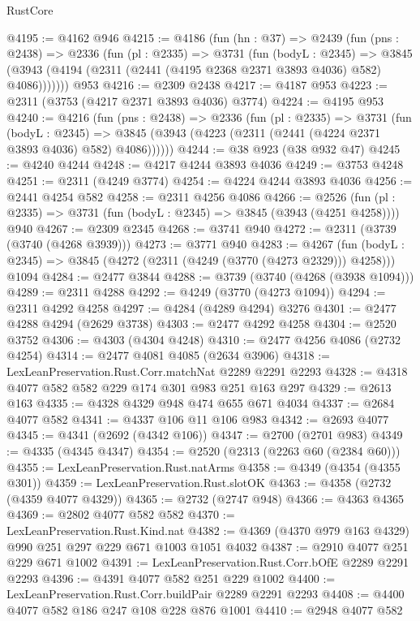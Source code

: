 \begin{lexlean}{RustCore}
\begin{coremodule}
@4195 := @4162 @946
@4215 := @4186
    (fun (hn : @37) =>
    @2439
      (fun (pns : @2438) =>
      @2336
        (fun (pl : @2335) =>
        @3731
          (fun (bodyL : @2345) =>
          @3845 (@3943 (@4194 (@2311 (@2441 (@4195 @2368 @2371 @3893 @4036) @582) @4086)))))))
    @953
@4216 := @2309 @2438
@4217 := @4187 @953
@4223 := @2311 (@3753 (@4217 @2371 @3893 @4036) @3774)
@4224 := @4195 @953
@4240 := @4216
    (fun (pns : @2438) =>
    @2336
      (fun (pl : @2335) =>
      @3731
        (fun (bodyL : @2345) =>
        @3845 (@3943 (@4223 (@2311 (@2441 (@4224 @2371 @3893 @4036) @582) @4086))))))
@4244 := @38 @923 (@38 @932 @47)
@4245 := @4240 @4244
@4248 := @4217 @4244 @3893 @4036
@4249 := @3753 @4248
@4251 := @2311 (@4249 @3774)
@4254 := @4224 @4244 @3893 @4036
@4256 := @2441 @4254 @582
@4258 := @2311 @4256 @4086
@4266 := @2526 (fun (pl : @2335) => @3731 (fun (bodyL : @2345) => @3845 (@3943 (@4251 @4258)))) @940
@4267 := @2309 @2345
@4268 := @3741 @940
@4272 := @2311 (@3739 (@3740 (@4268 @3939)))
@4273 := @3771 @940
@4283 := @4267
    (fun (bodyL : @2345) => @3845 (@4272 (@2311 (@4249 (@3770 (@4273 @2329))) @4258)))
    @1094
@4284 := @2477 @3844
@4288 := @3739 (@3740 (@4268 (@3938 @1094)))
@4289 := @2311 @4288
@4292 := @4249 (@3770 (@4273 @1094))
@4294 := @2311 @4292 @4258
@4297 := @4284 (@4289 @4294) @3276
@4301 := @2477 @4288 @4294 (@2629 @3738)
@4303 := @2477 @4292 @4258
@4304 := @2520 @3752
@4306 := @4303 (@4304 @4248)
@4310 := @2477 @4256 @4086 (@2732 @4254)
@4314 := @2477 @4081 @4085 (@2634 @3906)
@4318 := LexLeanPreservation.Rust.Corr.matchNat @2289 @2291 @2293
@4328 := @4318 @4077 @582 @582 @229 @174 @301 @983 @251 @163 @297
@4329 := @2613 @163
@4335 := @4328 @4329 @948 @474 @655 @671 @4034
@4337 := @2684 @4077 @582
@4341 := @4337 @106 @11 @106 @983
@4342 := @2693 @4077
@4345 := @4341 (@2692 (@4342 @106))
@4347 := @2700 (@2701 @983)
@4349 := @4335 (@4345 @4347)
@4354 := @2520 (@2313 (@2263 @60 (@2384 @60)))
@4355 := LexLeanPreservation.Rust.natArms
@4358 := @4349 (@4354 (@4355 @301))
@4359 := LexLeanPreservation.Rust.slotOK
@4363 := @4358 (@2732 (@4359 @4077 @4329))
@4365 := @2732 (@2747 @948)
@4366 := @4363 @4365
@4369 := @2802 @4077 @582 @582
@4370 := LexLeanPreservation.Rust.Kind.nat
@4382 := @4369 (@4370 @979 @163 @4329) @990 @251 @297 @229 @671 @1003 @1051 @4032
@4387 := @2910 @4077 @251 @229 @671 @1002
@4391 := LexLeanPreservation.Rust.Corr.bOfE @2289 @2291 @2293
@4396 := @4391 @4077 @582 @251 @229 @1002
@4400 := LexLeanPreservation.Rust.Corr.buildPair @2289 @2291 @2293
@4408 := @4400 @4077 @582 @186 @247 @108 @228 @876 @1001
@4410 := @2948 @4077 @582

\end{coremodule}
\end{lexlean}
